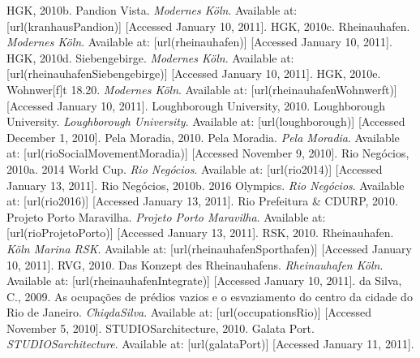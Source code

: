 {%
HGK, 2010b. Pandion Vista. {\em Modernes Köln}. Available at:  [url(kranhausPandion)] [Accessed January 10, 2011]. \nl%
%
HGK, 2010c. Rheinauhafen. {\em Modernes Köln}. Available at:  [url(rheinauhafen)] [Accessed January 10, 2011]. \nl%
%
HGK, 2010d. Siebengebirge. {\em Modernes Köln}. Available at:  [url(rheinauhafenSiebengebirge)] [Accessed January 10, 2011]. \nl%
%
HGK, 2010e. Wohnwer[f]t 18.20. {\em Modernes Köln}. Available at:  [url(rheinauhafenWohnwerft)] [Accessed January 10, 2011]. \nl%
%
Loughborough University, 2010. Loughborough University. {\em Loughborough University}. Available at:  [url(loughborough)] [Accessed December 1, 2010]. \nl%
%
Pela Moradia, 2010. Pela Moradia. {\em Pela Moradia}. Available at:  [url(rioSocialMovementMoradia)] [Accessed November 9, 2010]. \nl%
%
Rio Negócios, 2010a. 2014 World Cup. {\em Rio Negócios}. Available at:  [url(rio2014)] [Accessed January 13, 2011]. \nl%
%
Rio Negócios, 2010b. 2016 Olympics. {\em Rio Negócios}. Available at:  [url(rio2016)] [Accessed January 13, 2011]. \nl%
%
Rio Prefeitura \& CDURP, 2010. Projeto Porto Maravilha. {\em Projeto Porto Maravilha}. Available at:  [url(rioProjetoPorto)] [Accessed January 13, 2011]. \nl%
%
RSK, 2010. Rheinauhafen. {\em Köln Marina RSK}. Available at:  [url(rheinauhafenSporthafen)] [Accessed January 10, 2011]. \nl%
%
RVG, 2010. Das Konzept des Rheinauhafens. {\em Rheinauhafen Köln}. Available at:  [url(rheinauhafenIntegrate)] [Accessed January 10, 2011]. \nl%
%
da Silva, C., 2009. As ocupações de prédios vazios e o esvaziamento do centro da cidade do Rio de Janeiro. {\em ChiqdaSilva}. Available at:  [url(occupationsRio)] [Accessed November 5, 2010]. \nl%
%
STUDIOSarchitecture, 2010. Galata Port. {\em STUDIOSarchitecture}. Available at:  [url(galataPort)] [Accessed January 11, 2011]. \nl%
}
